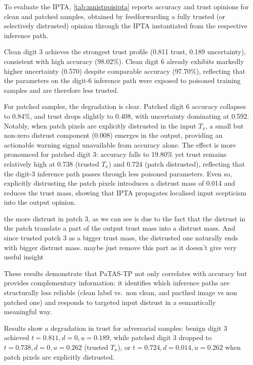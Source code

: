To evaluate the \ac{IPTA}, \cref{tab:mnistpoisipta} reports accuracy and trust
opinions for clean and patched samples, obtained by feedforwarding a fully trusted
(or selectively distrusted) opinion through the \ac{IPTA} instantiated from the
respective inference path.

Clean digit 3 achieves the strongest trust profile (0.811 trust, 0.189
uncertainty), consistent with high accuracy (98.02\%). Clean digit 6 already
exhibits markedly higher uncertainty (0.570) despite comparable accuracy (97.70\%),
reflecting that the parameters on the digit-6 inference path were exposed to
poisoned training samples and are therefore less trusted.

For patched samples, the degradation is clear. Patched digit 6 accuracy collapses
to 0.84\%, and trust drops slightly to 0.408, with uncertainty dominating at 0.592.
Notably, when patch pixels are explicitly distrusted in the input $T_x$, a small
but non-zero distrust component (0.008) emerges in the output, providing an
actionable warning signal unavailable from accuracy alone. The effect is more
pronounced for patched digit 3: accuracy falls to 19.80\% yet trust remains
relatively high at 0.738 (trusted $T_x$) and 0.724 (patch distrusted), reflecting
that the digit-3 inference path passes through less poisoned parameters. Even so,
explicitly distrusting the patch pixels introduces a distrust mass of 0.014 and
reduces the trust mass, showing that \ac{IPTA} propagates localised input
scepticism into the output opinion.

\todo the more distrust in patch 3, as we can see is due to the fact that the distrust in the patch translate a part of the output trust mass into a distrust mass. And since trusted patch 3 as a bigger trust mass, the distrusted one naturally ends with bigger distrust mass.
\todo maybe just remove this part as it doesn't give very useful insight 




These results demonstrate that \ac{PaTAS-TP} not only correlates with accuracy
but provides complementary information: it identifies which inference paths are
structurally less reliable \todo (clean label vs.\ non clean, and pacthed image vs non patched one) and responds to targeted input
distrust in a semantically meaningful way.






Results show a degradation in trust for adversarial samples: benign digit 3
achieved $t=0.811, d=0, u=0.189$, while patched digit 3 dropped to
$t=0.738, d=0, u=0.262$ (trusted $T_x$), or $t=0.724, d=0.014, u=0.262$ \todo 
when patch pixels are explicitly distrusted.

